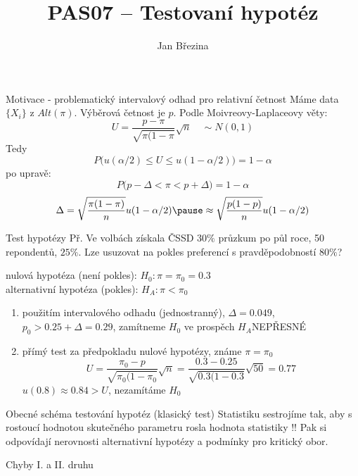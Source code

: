 \documentclass[smaller]{beamer}
\title{PAS07 -- Testovaní hypotéz}
\author{Jan B\v rezina}
\institute %
{
  Technical University of Liberec
}
\begin{document}
\begin{frame}
  \titlepage
\end{frame}

\def\df{\usebeamercolor[fg]{my red}\it}

\begin{frame}{Motivace - problematický intervalový odhad pro relativní četnost}
Máme data $\{X_i\}$ z $Alt(\pi)$. Výběrová četnost je $p$.
Podle Moivreovy-Laplaceovy věty:
\[
U = \frac{p - \pi}{\sqrt{\pi(1-\pi}}\sqrt{n} \quad \sim N(0,1)
\]
Tedy 
\[
 P\big(u(\alpha/2) \le U \le u(1-\alpha/2)\big) = 1-\alpha
\]
po upravě:
\[
 P\big(p-\Delta < \pi < p+\Delta) = 1-\alpha
\]
\[
 \Delta = \sqrt{\frac{\pi(1-\pi)}{n}}u(1-\alpha/2) \pause \approx \sqrt{\frac{p(1-p)}{n}}u(1-\alpha/2)
\]
\end{frame}

\begin{frame}{Test hypotézy}
Př. Ve volbách získala ČSSD $30\%$ průzkum po půl roce, 50 repondentů, $25\%$. Lze usuzovat na pokles preferencí s pravděpodobností $80\%$?

nulová hypotéza (není pokles): $H_0: \pi = \pi_0 = 0.3$ \\
alternativní hypotéza (pokles): $H_A: \pi < \pi_0$

\begin{enumerate}
\item použitím intervalového odhadu (jednostranný), $\Delta = 0.049$, $p_0 > 0.25 +\Delta=0.29$, zamítneme $H_0$ ve prospěch $H_A$\pause NEPŘESNÉ
\pause
\item přímý test za předpokladu nulové hypotézy, známe $\pi = \pi_0$
\[
 U=\frac{\pi_0 - p}{\sqrt{\pi_0(1-\pi_0}}\sqrt{n}=\frac{0.3 - 0.25}{\sqrt{0.3(1-0.3}}\sqrt{50} = 0.77
\]
$u(0.8) \approx 0.84 > U$, nezamítáme $H_0$ 

\end{enumerate}
\end{frame}

\begin{frame}{Obecné schéma testování hypotéz (klasický test)}
Statistiku sestrojíme tak, aby s rostoucí hodnotou skutečného parametru rosla hodnota statistiky !!
Pak si odpovídají nerovnosti alternativní hypotézy a podmínky pro kritický obor.
\end{frame}

\begin{frame}{Chyby I. a II. druhu}
\end{frame}
\end{document}
